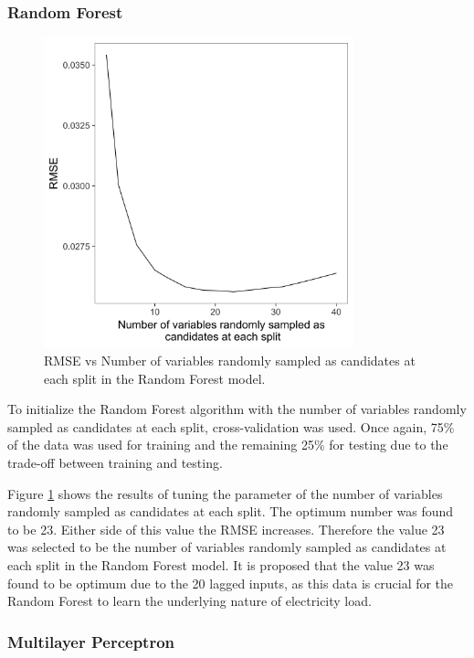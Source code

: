 \subsubsection{Random Forest}

\begin{figure}[b]
	\includegraphics[width=0.8\textwidth]{Chapter5/figures/short-term-forecasting/rforest_parameter_tuning}
	\caption{RMSE vs Number of variables randomly sampled as candidates at each split in the Random Forest model.}
	\label{fig:rf_param_tune}
\end{figure}

To initialize the Random Forest algorithm with the number of variables randomly sampled as candidates at each split, cross-validation was used. Once again, 75\% of the data was used for training and the remaining 25\% for testing due to the trade-off between training and testing.

Figure \ref{fig:rf_param_tune} shows the results of tuning the parameter of the number of variables randomly sampled as candidates at each split. The optimum number was found to be 23. Either side of this value the RMSE increases. Therefore the value 23 was selected to be the number of variables randomly sampled as candidates at each split in the Random Forest model. It is proposed that the value 23 was found to be optimum due to the 20 lagged inputs, as this data is crucial for the Random Forest to learn the underlying nature of electricity load.


\subsubsection{Multilayer Perceptron}

